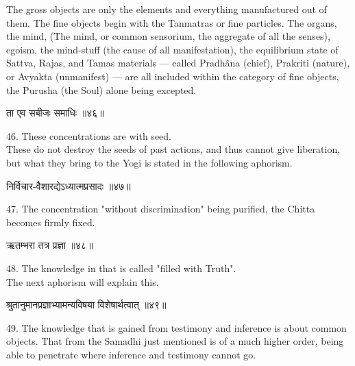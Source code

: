 The gross objects are only the elements and everything
manufactured out of them. The fine objects begin with the Tanmatras or
fine particles. The organs, the mind, (The mind, or common sensorium,
the aggregate of all the senses), egoism, the mind-stuff (the cause of
all manifestation), the equilibrium state of Sattva, Rajas, and Tamas
materials — called Pradhâna (chief), Prakriti (nature), or Avyakta
(unmanifest) — are all included within the category of fine objects,
the Purusha (the Soul) alone being excepted. \\

\begin{center}
\begin{sanskrit}
ता एव सबीजः समाधिः ॥४६॥
\end{sanskrit}
\end{center}
46. These concentrations are with seed. \\

These do not destroy the seeds of past actions, and thus
cannot give liberation, but what they bring to the Yogi is stated in
the following aphorism. \\

\begin{center}
\begin{sanskrit}
निर्विचार-वैशारद्येऽध्यात्मप्रसादः ॥४७॥
\end{sanskrit}
\end{center}
47. The concentration "without discrimination" being purified,
the Chitta becomes firmly fixed. \\

\begin{center}
\begin{sanskrit}
ऋतम्भरा तत्र प्रज्ञा ॥४८॥
\end{sanskrit}
\end{center}
48. The knowledge in that is called "filled with Truth". \\

The next aphorism will explain this. \\

\begin{center}
\begin{sanskrit}
श्रुतानुमानप्रज्ञाभ्यामन्यविषया
विशेषार्थत्वात् ॥४९॥
\end{sanskrit}
\end{center}
49. The knowledge that is gained from testimony and inference
is about common objects. That from the Samadhi just mentioned is of a
much higher order, being able to penetrate where inference and
testimony cannot go. \\

